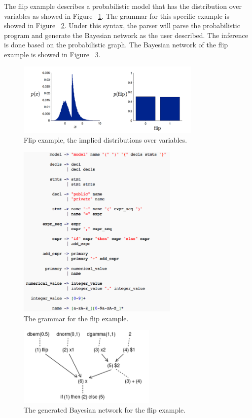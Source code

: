 The flip example describes a probabilistic model that has the distribution over variables as showed in Figure ~\ref{fig:flip_dist}. The grammar for this specific example is showed in Figure ~\ref{fig:flip_syn}. Under this syntax, the parser will parse the probabilistic program and generate the Bayesian network as the user described. The inference is done based on the probabilistic graph. The Bayesian network of the flip example is showed in Figure ~\ref{fig:flip_net}.


\begin{figure}
    \centering
    \includegraphics[width=0.8\textwidth]{figures/flip_dist.png}
    \caption{Flip example, the implied distributions over variables.}
    \label{fig:flip_dist}
\end{figure}

\begin{figure}
    \centering
    \includegraphics[width=0.7\textwidth]{figures/flip_syn.png}
    \caption{The grammar for the flip example.}
    \label{fig:flip_syn}
\end{figure}


\begin{figure}
    \centering
    \includegraphics[width=0.6\textwidth]{figures/flip_net.png}
    \caption{The generated Bayesian network for the flip example.}
    \label{fig:flip_net}
\end{figure}

